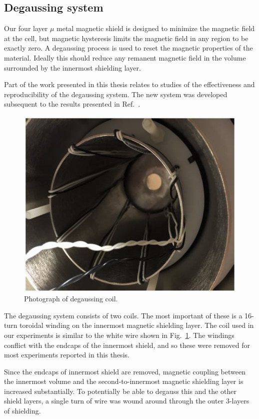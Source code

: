 \subsection{Degaussing system\label{sec:Degaussing}}

Our four layer $\mu$ metal magnetic shield is designed to minimize the
magnetic field at the cell, but magnetic hysteresis limits the
magnetic field in any region to be exactly zero.  A degaussing process
is used to reset the magnetic properties of the material.  Ideally
this should reduce any remanent magnetic field in the volume
surrounded by the innermost shielding layer.  

Part of the work presented in this thesis relates to studies of the
effectiveness and reproducibility of the degaussing system.  The new
system was developed subsequent to the results presented in
Ref.~\cite{bib:nmor}.

\begin{figure}%
\centering
\includegraphics[width=0.6\linewidth]{figures/degaussing_coil.png}
\caption{Photograph of degaussing coil.\label{fig:degaussing_ccoil.}}
\end{figure}

The degaussing system consists of two coils.  The most important of
these is a 16-turn toroidal winding on the innermost magnetic
shielding layer.  The coil used in our experiments is similar to the
white wire shown in Fig.~\ref{fig:degaussing_ccoil.}.  The windings
conflict with the endcaps of the innermost shield, and so these were
removed for most experiments reported in this thesis.

Since the endcaps of innermost shield are removed, magnetic coupling
between the innermost volume and the second-to-innermost magnetic
shielding layer is increased substantially.  To potentially be able to
degauss this and the other shield layers, a single turn of wire was
wound around through the outer 3-layers of shielding.

